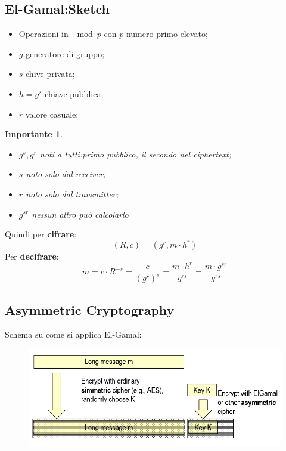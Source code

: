 \documentclass{book}
\newtheorem*{Importante}{\textbf{Importante}}
\begin{document}
\subsection{El-Gamal:Sketch}
\begin{itemize}
    \item Operazioni in \(\mod{p}\) con \(p\) numero primo elevato;
    \item \(g\) generatore di gruppo;
    \item \(s\) chive privata;
    \item \(h=g^{s}\) chiave pubblica;
    \item \(r\) valore casuale;
\end{itemize}
\begin{Importante}
    \begin{itemize}
        \item \(g^{s},g^{r}\) noti a tutti:\@il primo pubblico, il secondo nel ciphertext;
        \item \(s\) noto solo dal receiver;
        \item \(r\) noto solo dal transmitter;
        \item \(g^{sr}\) nessun altro può calcolarlo
    \end{itemize}
\end{Importante}
Quindi per \textbf{cifrare}:\begin{equation*}
    (R,c)=(g^{r},m\cdot h^{r})
\end{equation*}
Per \textbf{decifrare}:\begin{equation*}
    m=c\cdot R^{-s}=\frac{c}{{(g^{r})}^{s}}=\frac{m\cdot h^{r}}{g^{rs}}=\frac{m\cdot g^{sr}}{g^{rs}}
\end{equation*}
\newpage
\subsection{Asymmetric Cryptography}
Schema su come si applica El-Gamal:
\begin{figure}[ht]
    \centering
    \includegraphics[scale=0.5]{2022-01-03-15-37-08.png}%
\end{figure}
\end{document}
